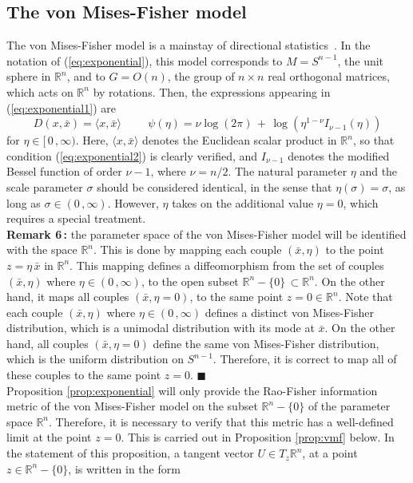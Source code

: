 \documentclass{svmult}
\begin{document}
\subsection{The von Mises-Fisher model} \label{subsec:vmf}
The von Mises-Fisher model is a mainstay of directional statistics~\cite{jupp}\cite{chikuse}. In the notation of  (\ref{eq:exponential}), this model corresponds to $M = S^{n-1}$, the unit sphere in $\mathbb{R}^{n}$, and to $G = O(n)$, the group of $n\times n$ real orthogonal matrices, which acts on $\mathbb{R}^n$ by rotations. Then, the expressions appearing in (\ref{eq:exponential1}) are
\begin{equation} \label{eq:vmf}
   D(x,\bar{x}) = \langle x,\bar{x}\rangle \hspace{1cm} \psi(\eta) = \nu\log(2\pi) \,+\,\log\left( \eta^{1-\nu}I_{\nu-1}(\eta)\right) 
\end{equation}
for $\eta \in [\,0\,,\infty)$. Here, $\langle x,\bar{x}\rangle$ denotes the Euclidean scalar product in $\mathbb{R}^n$, so that condition (\ref{eq:exponential2}) is clearly verified, and $I_{\nu - 1}$ denotes the modified Bessel function of order $\nu - 1$, where $\nu = n/2$. The natural parameter $\eta$ and the scale parameter $\sigma$ should be considered identical, in the sense that $\eta(\sigma) = \sigma$, as long as $\sigma \in (0\,,\infty)$. However, $\eta$ takes on the additional value $\eta = 0$, which requires a special treatment.\\[0.1cm]
\textbf{Remark 6\,:} the parameter space of the von Mises-Fisher model will be identified with the space $\mathbb{R}^n$. This is done by mapping each couple $(\bar{x},\eta)$ to the point $z =\eta\,\bar{x}$ in $\mathbb{R}^n$. This mapping defines a diffeomorphism from the set of couples $(\bar{x},\eta)$ where $\eta \in (0\,,\infty)$, to the open subset $\mathbb{R}^n - \lbrace 0 \rbrace \,\subset \mathbb{R}^n$. On the other hand, it maps all couples 
$(\bar{x},\eta=0)$, to the same point $z = 0 \in \mathbb{R}^n$. Note that each couple $(\bar{x},\eta)$ where $\eta \in (0\,,\infty)$ defines a distinct von Mises-Fisher distribution, which is a unimodal distribution with its mode at $\bar{x}$. On the other hand, all couples $(\bar{x},\eta=0)$ define the same von Mises-Fisher distribution, which is the uniform distribution on $S^{n-1}$. Therefore, it is correct to map all of these couples to the same point $z = 0$. \hfill$\blacksquare$ \\[0.1cm]
Proposition \ref{prop:exponential} will only provide the Rao-Fisher information metric of the von Mises-Fisher model on the subset $\mathbb{R}^n - \lbrace 0 \rbrace$ of the parameter space $\mathbb{R}^n$. Therefore, it is necessary to verify that this metric has a well-defined limit at the point $z = 0$. This is carried out in Proposition \ref{prop:vmf} below. In the statement of this proposition, a tangent vector $U \in T_z\mathbb{R}^n$, at a point $z \in \mathbb{R}^n - \lbrace 0 \rbrace$, is written in the form
\end{document}
